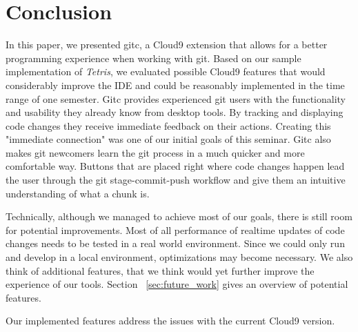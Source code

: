 \section{Conclusion}
\label{sec:Conclusion}

In this paper, we presented gitc, a Cloud9 extension that allows for a better programming experience when working with git. 
Based on our sample implementation of \textit{Tetris}, we evaluated possible Cloud9 features that would considerably improve the IDE and could be reasonably implemented in the time range of one semester.
Gitc provides experienced git users with the functionality and usability they already know from desktop tools. 
By tracking and displaying code changes they receive immediate feedback on their actions. 
Creating this "immediate connection" was one of our initial goals of this seminar. 
Gitc also makes git newcomers learn the git process in a much quicker and more comfortable way. Buttons that are placed right where code changes happen lead the user through the git stage-commit-push workflow and give them an intuitive understanding of what a chunk is.

Technically, although we managed to achieve most of our goals, there is still room for potential improvements. 
Most of all performance of realtime updates of code changes needs to be tested in a real world environment. 
Since we could only run and develop in a local environment, optimizations may become necessary. 
We also think of additional features, that we think would yet further improve the experience of our tools. 
Section ~\ref{sec:future_work} gives an overview of potential features.

Our implemented features address the issues with the current Cloud9 version. 
